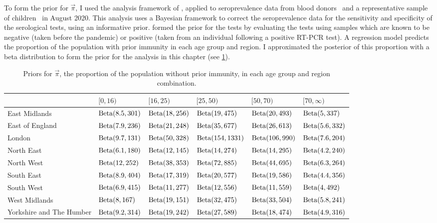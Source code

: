 \documentclass[thesis.tex]{subfiles}
\begin{document}
\begin{landscape}
To form the prior for $\vec{\pi}$, I used the analysis framework of \textcite{amirthalingamSeroprevalence}, applied to seroprevalence data from blood donors~\autocite{amirthalingamSeroprevalence} and a representative sample of children~\autocite{ratcliffeCommunity} in August 2020.
This analysis uses a Bayesian framework to correct the seroprevalence data for the sensitivity and specificity of the serological tests, using an informative prior.
\Textcite{amirthalingamSeroprevalence} formed the prior for the tests by evaluating the tests using samples which are known to be negative (taken before the pandemic) or positive (taken from an individual following a positive RT-PCR test).
A regression model predicts the proportion of the population with prior immunity in each age group and region.
I approximated the posterior of this proportion with a beta distribution to form the prior for the analysis in this chapter (see \cref{SEIR:table:immunity-prior}).
\begin{table}
\centering
\begin{tabular}{l|lllll}
         & $[0,16)$ & $[16,25)$ & $[25,50)$ & $[50,70)$ & $[70,\infty)$ \\
        \hline
        East Midlands & $\operatorname{Beta}(8.5, 301)$ & $\operatorname{Beta}(18, 256)$ & $\operatorname{Beta}(19, 475)$ & $\operatorname{Beta}(20, 493)$ & $\operatorname{Beta}(5, 337)$ \\
        East of England & $\operatorname{Beta}(7.9, 236)$ & $\operatorname{Beta}(21, 248)$ & $\operatorname{Beta}(35, 677)$ & $\operatorname{Beta}(26, 613)$ & $\operatorname{Beta}(5.6, 332)$ \\
        London & $\operatorname{Beta}(9.7, 131)$ & $\operatorname{Beta}(50, 328)$ & $\operatorname{Beta}(154, 1331)$ & $\operatorname{Beta}(106, 990)$ & $\operatorname{Beta}(7.6, 204)$ \\
        North East & $\operatorname{Beta}(6.1, 180)$ & $\operatorname{Beta}(12, 145)$ & $\operatorname{Beta}(14, 274)$ & $\operatorname{Beta}(14, 295)$ & $\operatorname{Beta}(4.2, 240)$ \\
        North West & $\operatorname{Beta}(12, 252)$ & $\operatorname{Beta}(38, 353)$ & $\operatorname{Beta}(72, 885)$ & $\operatorname{Beta}(44, 695)$ & $\operatorname{Beta}(6.3, 264)$ \\
        South East & $\operatorname{Beta}(8.9, 404)$ & $\operatorname{Beta}(17, 319)$ & $\operatorname{Beta}(20, 577)$ & $\operatorname{Beta}(19, 586)$ & $\operatorname{Beta}(4.4, 356)$ \\
        South West & $\operatorname{Beta}(6.9, 415)$ & $\operatorname{Beta}(11, 277)$ & $\operatorname{Beta}(12, 556)$ & $\operatorname{Beta}(11, 559)$ & $\operatorname{Beta}(4, 492)$ \\
        West Midlands & $\operatorname{Beta}(8, 167)$ & $\operatorname{Beta}(19, 151)$ & $\operatorname{Beta}(32, 475)$ & $\operatorname{Beta}(33, 504)$ & $\operatorname{Beta}(5.8, 241)$ \\
        Yorkshire and The Humber & $\operatorname{Beta}(9.2, 314)$ & $\operatorname{Beta}(19, 242)$ & $\operatorname{Beta}(27, 589)$ & $\operatorname{Beta}(18, 474)$ & $\operatorname{Beta}(4.9, 316)$ \\
    \end{tabular}
\caption{Priors for $\vec{\pi}$, the proportion of the population without prior immunity, in each age group and region combination.}
\label{SEIR:table:immunity-prior}
\end{table}
\end{landscape}
\end{document}
